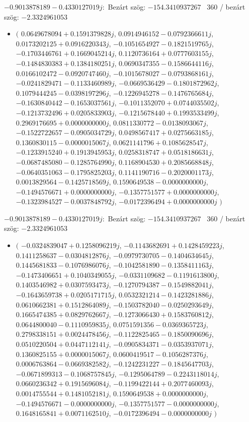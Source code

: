 \documentclass[14pt,a4paper]{article}
\begin{document}
$-0.9013878189-0.4330127019j$:\
Bezárt szög: $-154.3410937267$ \
360 / bezárt szög: $-2.3324961053$\
\begin{itemize}
\item
$\big($
$0.0649678094+0.1591379828j$, $0.0914946152-0.0792366611j$, $0.0173202125+0.0916220343j$, $-0.1051654927-0.1821519765j$, $-0.1703446761+0.1669045214j$, $0.1120736164+0.0777603155j$, $-0.1484830383+0.1384180251j$, $0.0690347355-0.1586644116j$, $0.0166102472-0.0920747460j$, $-0.1015678027-0.0793868161j$, $-0.0241829471-0.1133460989j$, $-0.0669536429-0.1801872962j$, $0.1079444245-0.0398197296j$, $-0.1226945278-0.1476765684j$, $-0.1630840442-0.1653037561j$, $-0.1011352070+0.0744035502j$, $-0.1213732496+0.0205833903j$, $-0.1215678440+0.1993533499j$, $0.2969176695+0.0000000000j$, $0.0811330772-0.0138093067j$, $-0.1522722657-0.0905034729j$, $0.0498567417+0.0275663185j$, $0.1360830115-0.0000015067j$, $0.0621141796+0.1085628547j$, $-0.1233915240+0.1913945953j$, $0.0258318747+0.0518186631j$, $-0.0687485080-0.1285764990j$, $0.1168904530+0.2085668848j$, $-0.0640351063-0.1795825203j$, $0.1141190716-0.2020001173j$, $0.0013829564-0.1425718569j$, $0.1590649538-0.0000000000j$, $-0.1494576671+0.0000000000j$, $-0.1357751577+0.0000000000j$, $-0.1323984527-0.0037848792j$, $-0.0172396494+0.0000000000j$
$\big)$
\end{itemize}
$-0.9013878189-0.4330127019j$:\
Bezárt szög: $-154.3410937267$ \
360 / bezárt szög: $-2.3324961053$\
\begin{itemize}
\item
$\big($
$-0.0324839047+0.1258096219j$, $-0.1143682691+0.1428459223j$, $0.1411258637-0.0304812876j$, $-0.0979730705-0.1404634645j$, $0.1445681833-0.1076986076j$, $-0.1042581890-0.1358411163j$, $-0.1473406651+0.1040349055j$, $-0.0331109682-0.1191613800j$, $0.1403546982+0.0307593473j$, $-0.1270794387-0.1549882041j$, $-0.1643659738+0.0205171715j$, $0.0532321214-0.1423281886j$, $0.0610662381+0.1512864089j$, $-0.1503782040-0.0250293649j$, $0.1665474385+0.0829762667j$, $-0.1273066430+0.1583760812j$, $0.0644800040-0.1110959835j$, $0.0751591356-0.0369365723j$, $0.2798338151+0.0024478456j$, $-0.1122825465-0.1850090696j$, $0.0510220504+0.0447112141j$, $-0.0905834371-0.0353937071j$, $0.1360825155+0.0000015067j$, $0.0600419517-0.1056287376j$, $0.0006763864-0.0669382582j$, $-0.1242231227-0.1845647703j$, $-0.0671899313-0.1068757845j$, $-0.1295064789-0.2243118014j$, $0.0660236342+0.1915696084j$, $-0.1199422144+0.2077460093j$, $0.0014755544+0.1481052181j$, $0.1590649538+0.0000000000j$, $-0.1494576671-0.0000000000j$, $-0.1357751577-0.0000000000j$, $0.1648165841+0.0071162510j$, $-0.0172396494-0.0000000000j$
$\big)$
\end{itemize}
\end{document}
